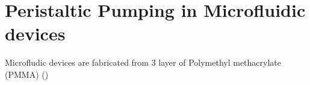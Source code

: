 \documentclass[a4paper,twoside,openright]{report}
\begin{document}
\chapter{Peristaltic Pumping in Microfluidic devices} \label{Chapter:Peristaltic Pumping in Microfluidic devices}

Microfludic devices are fabricated from 3 layer of Polymethyl methacrylate (PMMA) ()
\end{document}
